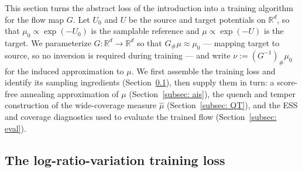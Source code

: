 \documentclass{article}
\begin{document}
This section turns the abstract loss of the introduction into a training algorithm for the flow map $G$. Let $U_0$ and $U$ be the source and target potentials on $\mathbb R^d$, so that $\mu_0 \propto \exp(-U_0)$ is the samplable reference and $\mu \propto \exp(-U)$ is the target. We parameterize $G:\mathbb R^d\to\mathbb R^d$ so that $G_{\#}\mu \approx \mu_0$ --- mapping target to source, so no inversion is required during training --- and write $\nu := (G^{-1})_{\#}\mu_0$ for the induced approximation to $\mu$. We first assemble the training loss and identify its sampling ingredients (Section~\ref{subsec: total-loss}), then supply them in turn: a score-free annealing approximation of $\mu$ (Section~\ref{subsec: ais}), the quench and temper construction of the wide-coverage measure $\hat\mu$ (Section~\ref{subsec: QT}), and the ESS and coverage diagnostics used to evaluate the trained flow (Section~\ref{subsec: eval}).

\subsection{The log-ratio-variation training loss}
\label{subsec: total-loss}
\end{document}

